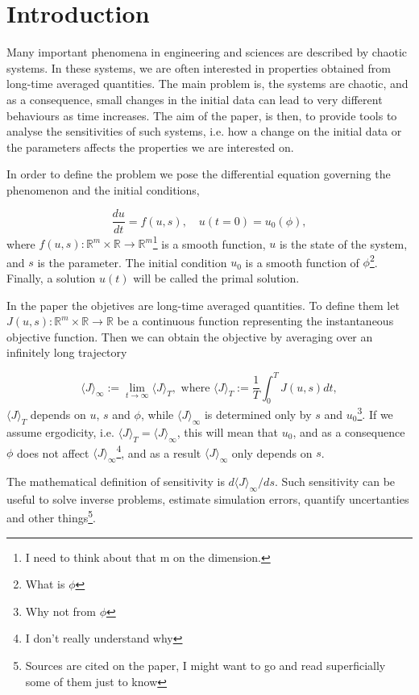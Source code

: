 \documentclass[12pt,twoside,a4paper]{article} %
\begin{document}
\section{Introduction}
Many important phenomena in engineering and sciences are described by chaotic systems. In these systems, we are often interested in properties obtained from long-time averaged quantities. The main problem is, the systems are chaotic, and as a consequence, small changes in the initial data can lead to very different behaviours as time increases. The aim of the paper, is then, to provide tools to analyse the sensitivities of such systems, i.e. how a change on the initial data or the parameters affects the properties we are interested on.

In order to define the problem we pose the differential equation governing the phenomenon and the initial conditions,

\begin{equation}
\frac{du}{dt} = f(u,s), \quad u(t=0) = u_0(\phi),
\end{equation}
where $f(u,s): \mathbb{R}^m \times \mathbb{R} \rightarrow \mathbb{R}^m$\footnote{I need to think about that m on the dimension.} is a smooth function, $u$ is the state of the system, and $s$ is the parameter. The initial condition $u_0$ is a smooth function of $\phi$\footnote{What is $\phi$}. Finally, a solution $u(t)$ will be called the primal solution.

In the paper the objetives are long-time averaged quantities. To define them let $J(u,s): \mathbb{R}^m \times \mathbb{R} \rightarrow \mathbb{R}$ be a continuous function representing the instantaneous objective function. Then we can obtain the objective by averaging over an infinitely long trajectory

\begin{equation}
  \langle J \rangle_\infty := \lim_{t\to\infty} \langle J \rangle_T, \textrm{ where } \langle J \rangle_T := \frac{1}{T}\int_0^T J(u,s)dt,
\end{equation}
$\langle J \rangle_T$ depends on $u$, $s$ and $\phi$, while $\langle J \rangle_\infty$ is determined only by $s$ and $u_0$\footnote{Why not from $\phi$}. If we assume ergodicity, i.e. $\langle J \rangle_T = \langle J \rangle_\infty$, this will mean that $u_0$, and as a consequence $\phi$ does not affect $\langle J \rangle_\infty$\footnote{I don't really understand why}, and as a result $\langle J \rangle_\infty$ only depends on $s$.

The mathematical definition of sensitivity is $d\langle J \rangle_\infty / ds$. Such sensitivity can be useful to solve inverse problems, estimate simulation errors, quantify uncertanties and other things\footnote{Sources are cited on the paper, I might want to go and read superficially some of them just to know}.
\end{document}
